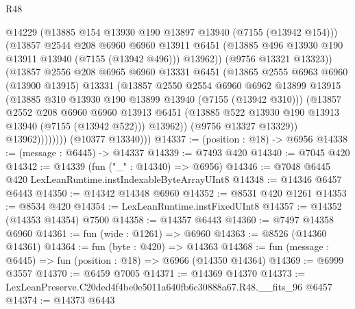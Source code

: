\begin{lexlean}{R48}
\begin{coremodule}
                          @14229
                          (@13885 @154 @13930 @190 @13897 @13940 (@7155 (@13942 @154)))
                          (@13857
                            @2544
                            @208
                            @6960
                            @6960
                            @13911
                            @6451
                            (@13885 @496 @13930 @190 @13911 @13940 (@7155 (@13942 @496)))
                            @13962))
                        (@9756 @13321 @13323))
                      (@13857
                        @2556
                        @208
                        @6965
                        @6960
                        @13331
                        @6451
                        (@13865
                          @2555
                          @6963
                          @6960
                          (@13900 @13915)
                          @13331
                          (@13857
                            @2550
                            @2554
                            @6960
                            @6962
                            @13899
                            @13915
                            (@13885 @310 @13930 @190 @13899 @13940 (@7155 (@13942 @310)))
                            (@13857
                              @2552
                              @208
                              @6960
                              @6960
                              @13913
                              @6451
                              (@13885 @522 @13930 @190 @13913 @13940 (@7155 (@13942 @522)))
                              @13962))
                          (@9756 @13327 @13329))
                        @13962))))))))
        (@10377 @13340)))
@14337 := (position : @18) -> @6956
@14338 := (message : @6445) -> @14337
@14339 := @7493 @420
@14340 := @7045 @420
@14342 := @14339 (fun ("_" : @14340) => @6956)
@14346 := @7048 @6445 @420 LexLeanRuntime.instIndexableByteArrayUInt8
@14348 := @14346 @6457 @6443
@14350 := @14342 @14348 @6960
@14352 := @8531 @420 @1261
@14353 := @8534 @420
@14354 := LexLeanRuntime.instFixedUInt8
@14357 := @14352 (@14353 @14354) @7500
@14358 := @14357 @6443
@14360 := @7497 @14358 @6960
@14361 := fun (wide : @1261) => @6960
@14363 := @8526 (@14360 @14361)
@14364 := fun (byte : @420) => @14363
@14368 := fun (message : @6445) => fun (position : @18) => @6966 (@14350 @14364)
@14369 := @6999 @3557
@14370 := @6459 @7005
@14371 := @14369 @14370
@14373 := LexLeanPreserve.C20ded4f4be0e5011a640fb6c30888a67.R48.__fits_96 @6457
@14374 := @14373 @6443

\end{coremodule}
\end{lexlean}
